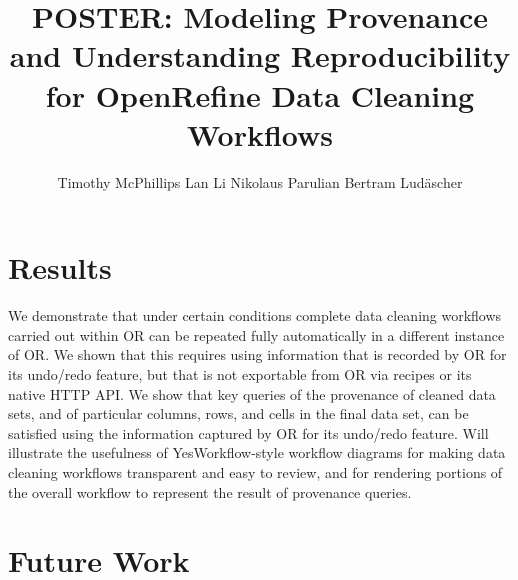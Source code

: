 \documentclass[sigconf,screen,nonacm]{acmart}
\begin{document}
\title[Reproducible Data Cleaning]{POSTER: Modeling
  Provenance and Understanding Reproducibility for OpenRefine Data
  Cleaning Workflows}

\author{Timothy McPhillips \qquad Lan Li \qquad Nikolaus Parulian \qquad Bertram Lud\"ascher}
 

\maketitle







\section{Results}

We demonstrate that under certain conditions complete data cleaning workflows carried out within OR can be repeated fully automatically in a different instance of OR.  We shown that this requires using information that is recorded by OR for its undo/redo feature, but that is not exportable from OR via recipes or its native HTTP API.
We show that key queries of the provenance of cleaned data sets, and of particular columns, rows, and cells in the final data set, can be satisfied using the information captured by OR for its undo/redo feature.
Will illustrate the usefulness of YesWorkflow-style workflow diagrams for making data cleaning workflows transparent and easy to review, and for rendering portions of the overall workflow to represent the result of provenance queries.

\section{Future Work}



%


\end{document}
